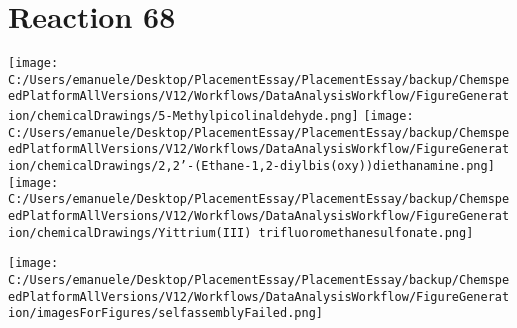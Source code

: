 \documentclass{article}%
\begin{document}
\section*{Reaction 68}%
%
\begin{scheme}[H]%
\begin{minipage}{0.5\textwidth}%
\texttt{[image: C:/Users/emanuele/Desktop/PlacementEssay/PlacementEssay/backup/ChemspeedPlatformAllVersions/V12/Workflows/DataAnalysisWorkflow/FigureGeneration/chemicalDrawings/5-Methylpicolinaldehyde.png]}%
\texttt{[image: C:/Users/emanuele/Desktop/PlacementEssay/PlacementEssay/backup/ChemspeedPlatformAllVersions/V12/Workflows/DataAnalysisWorkflow/FigureGeneration/chemicalDrawings/2,2'-(Ethane-1,2-diylbis(oxy))diethanamine.png]}%
\texttt{[image: C:/Users/emanuele/Desktop/PlacementEssay/PlacementEssay/backup/ChemspeedPlatformAllVersions/V12/Workflows/DataAnalysisWorkflow/FigureGeneration/chemicalDrawings/Yittrium(III) trifluoromethanesulfonate.png]}%
\end{minipage}%
\begin{minipage}{0.5\textwidth}%
\begin{center}%
\texttt{[image: C:/Users/emanuele/Desktop/PlacementEssay/PlacementEssay/backup/ChemspeedPlatformAllVersions/V12/Workflows/DataAnalysisWorkflow/FigureGeneration/imagesForFigures/selfassemblyFailed.png]}%
\end{center}%
\end{minipage}%
\caption{Self-assembly of components 3, 19, with Yittrium(III) in a 3.0:1.5:1.0 molar ratio in CH$_3$CN at 60\textdegree C for 40h. These are the reagents (starting materials) for reaction 68.}%
\end{scheme}%
\end{document}
